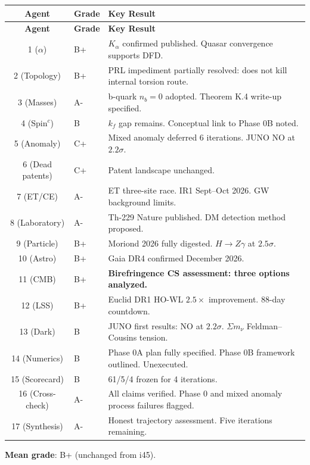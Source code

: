 \documentclass[11pt,a4paper]{article}
\begin{document}
\begin{center}
\begin{longtable}{clp{9cm}}
\toprule
\textbf{Agent} & \textbf{Grade} & \textbf{Key Result} \\
\midrule
\endfirsthead
\toprule
\textbf{Agent} & \textbf{Grade} & \textbf{Key Result} \\
\midrule
\endhead
1 ($\alpha$) & B+ & $K_\alpha$ confirmed published. Quasar convergence supports DFD. \\
2 (Topology) & B+ & PRL impediment partially resolved: does not kill internal torsion route. \\
3 (Masses) & A- & b-quark $n_b = 0$ adopted. Theorem K.4 write-up specified. \\
4 (Spin$^c$) & B & $k_f$ gap remains. Conceptual link to Phase 0B noted. \\
5 (Anomaly) & C+ & Mixed anomaly deferred 6 iterations. JUNO NO at $2.2\sigma$. \\
6 (Dead patents) & C+ & Patent landscape unchanged. \\
7 (ET/CE) & A- & ET three-site race. IR1 Sept--Oct 2026. GW background limits. \\
8 (Laboratory) & A- & Th-229 Nature published. DM detection method proposed. \\
9 (Particle) & B+ & Moriond 2026 fully digested. $H \to Z\gamma$ at $2.5\sigma$. \\
10 (Astro) & B+ & Gaia DR4 confirmed December 2026. \\
11 (CMB) & B+ & \textbf{Birefringence CS assessment: three options analyzed.} \\
12 (LSS) & B+ & Euclid DR1 HO-WL $2.5\times$ improvement. 88-day countdown. \\
13 (Dark) & B & JUNO first results: NO at $2.2\sigma$. $\Sigma m_\nu$ Feldman--Cousins tension. \\
14 (Numerics) & B & Phase 0A plan fully specified. Phase 0B framework outlined. Unexecuted. \\
15 (Scorecard) & B & 61/5/4 frozen for 4 iterations. \\
16 (Cross-check) & A- & All claims verified. Phase 0 and mixed anomaly process failures flagged. \\
17 (Synthesis) & A- & Honest trajectory assessment. Five iterations remaining. \\
\bottomrule
\end{longtable}
\end{center}

\textbf{Mean grade}: B+ (unchanged from i45).
\end{document}
